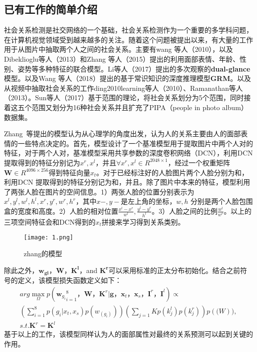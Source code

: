 \subsection{已有工作的简单介绍}

社会关系检测是社交网络的一个基础\cite{li2015celebritynet}，社会关系检测作为一个重要的多学科问题，在计算机视觉领域受到越来越多的关注。随着这个问题被提出以来，有大量的工作用于从图片中抽取两个人之间的社会关系。主要有wang 等人（2010）\cite{wang2010seeing}，以及Dibeklioglu等人（2013）\cite{dibeklioglu2013like}和Zhang 等人（2015）\cite{zhang2015learning}提出的利用面部表情、年龄、性别、姿势等多种特征的联合模型。Li等人（2017）\cite{li2017dual-glance}提出的多次观察的\textbf{dual-glance}模型。以及Wang 等人（2018）\cite{wang2018deep}提出的基于常识知识的深度推理模型\textbf{GRM}。以及从视频中抽取社会关系的工作ding2010learning等人（2010）、Ramanathan等人 （2013）\cite{ramanathan2013social}。Sun等人（2017）\cite{sun2017a}基于范围的理论，将社会关系划分为5个范围，同时接着这五个范围又划分为16种社会关系并且扩充了PIPA（people in photo album）数据集\cite{zhang2015beyond}。

Zhang~等\cite{zhang2015learning}提出的模型认为从心理学的角度出发，认为人的关系主要由人的面部表情的一些特点决定的。首先，模型设计了一个基准模型用于提取图片中两个人对的特征，对于两个人对，基准模型采用共享参数的深度卷积网络（DCN），利用DCN提取得到的特征分别记为$x^r,x^l$，并且$\forall x^r,x^l \in R^{2048 \times 1}$，经过一个权重矩阵$\mathbf{W} \in R^{4096 \times 256}$得到特征向量$x_t$。对于已经标注好的人脸图片两个人脸分别为和，利用DCN 提取得到的特征分别记为和，并且。除了图片中本来的特征，模型利用了两张人脸在图片的空间信息。1）两张人脸的位置分别表示为${x^l,y^l,w^l,h^l,x^r,y^r,w^r,h^r}$，其中$x-,y-$是左上角的坐标，$w,h$ 分别是两个人脸包围盒的宽度和高度。2）人脸的相对位置$\frac{x^l-x^r}{w^l},\frac{y^l-y^r}{h^l}$。3）人脸之间的比例$\frac{w^l}{w^r}$。以上的三项空间特征会和DCN得到的$x_t$拼接来学习得到关系类别。
\begin{figure}[htpb]
	\centering
	\texttt{[image: 1.png]}
    \caption{zhang的模型}
	\vspace*{-3.5mm}
	\label{fig:model_zhang}
\end{figure}
除此之外，$\mathbf{w_{gi}}$，$\mathbf{W}$，$\mathbf{K^l}$，and $\mathbf{K^r}$可以采用标准的正太分布初始化。结合之前符号的定义，该模型损失函数定义如下：
\begin{equation}
\begin{split}
     arg\max \limits_{\Omega} p({\mathbf{w}_{g_i}}_{i=1}^8， \mathbf{W}，\mathbf{K}^r | \mathbf{g}，\mathbf{x}_t，\mathbf{x}_s，\mathbf{I}^r，\mathbf{I}^l) \propto \\
     (\sum_{i=1}^{8}p(g_i|x_t,x_s)p(w_(g_i)))(\sum_{j=1}{K}p(k_j^l)p(k_j^r))p(\mathbf(W)), \\
     s.t. \mathbf{K}^r = \mathbf{K}^l
\end{split}
\end{equation}
基于以上的工作，该模型同样认为人的面部属性对最终的关系预测可以起到关键的作用。

